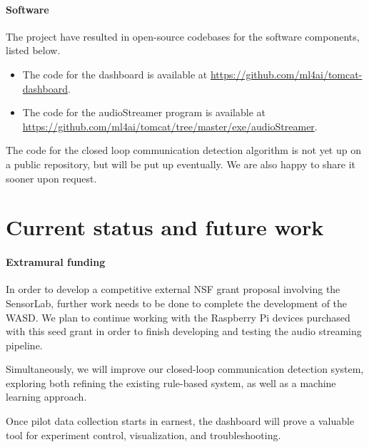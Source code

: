 \paragraph{Software} The project have resulted in open-source codebases for the
software components, listed below.

\begin{itemize}

    \item The code for the dashboard is available at
        \url{https://github.com/ml4ai/tomcat-dashboard}.
    \item The code for the audioStreamer program is available at
        \url{https://github.com/ml4ai/tomcat/tree/master/exe/audioStreamer}.

\end{itemize}

The code for the closed loop communication detection algorithm is not yet up on
a public repository, but will be put up eventually. We are also happy to share
it sooner upon request.

\section{Current status and future work}

\paragraph{Extramural funding} In order to develop a competitive external NSF
grant proposal involving the SensorLab, further work needs to be done to
complete the development of the WASD. We plan to continue working with the
Raspberry Pi devices purchased with this seed grant in order to finish
developing and testing the audio streaming pipeline.

Simultaneously, we will improve our closed-loop communication detection system,
exploring both refining the existing rule-based system, as well as a machine
learning approach.

Once pilot data collection starts in earnest, the dashboard will prove a
valuable tool for experiment control, visualization, and troubleshooting.
